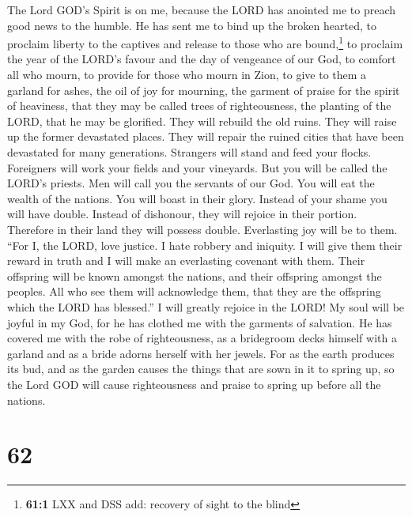  The Lord GOD's Spirit is on me, because the LORD has
anointed me to preach good news to the humble. He has sent me to bind up
the broken hearted, to proclaim liberty to the captives and release to
those who are bound,\footnote{\textbf{61:1} LXX and DSS add: recovery of
  sight to the blind}  to proclaim the year of the LORD's
favour and the day of vengeance of our God, to comfort all who mourn,
 to provide for those who mourn in Zion, to give to them a
garland for ashes, the oil of joy for mourning, the garment of praise
for the spirit of heaviness, that they may be called trees of
righteousness, the planting of the LORD, that he may be glorified.
 They will rebuild the old ruins. They will raise up the
former devastated places. They will repair the ruined cities that have
been devastated for many generations.  Strangers will
stand and feed your flocks. Foreigners will work your fields and your
vineyards.  But you will be called the LORD's priests. Men
will call you the servants of our God. You will eat the wealth of the
nations. You will boast in their glory.  Instead of your
shame you will have double. Instead of dishonour, they will rejoice in
their portion. Therefore in their land they will possess double.
Everlasting joy will be to them.  ``For I, the LORD, love
justice. I hate robbery and iniquity. I will give them their reward in
truth and I will make an everlasting covenant with them. 
Their offspring will be known amongst the nations, and their offspring
amongst the peoples. All who see them will acknowledge them, that they
are the offspring which the LORD has blessed.''  I will
greatly rejoice in the LORD! My soul will be joyful in my God, for he
has clothed me with the garments of salvation. He has covered me with
the robe of righteousness, as a bridegroom decks himself with a garland
and as a bride adorns herself with her jewels.  For as
the earth produces its bud, and as the garden causes the things that are
sown in it to spring up, so the Lord GOD will cause righteousness and
praise to spring up before all the nations.

\hypertarget{section-59}{%
\section{62}\label{section-59}}

